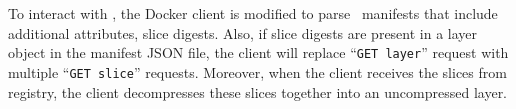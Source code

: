 To interact with \sysname, the Docker client is modified to 
parse \sysname~manifests that include additional attributes, %
\ie slice digests.
Also, if slice digests are present in a layer object in the manifest JSON file, 
the client will replace ``\texttt{GET layer}'' request with multiple ``\texttt{GET slice}'' requests.
Moreover, when the client receives the slices from registry, 
the client decompresses these slices together into an uncompressed layer.  






